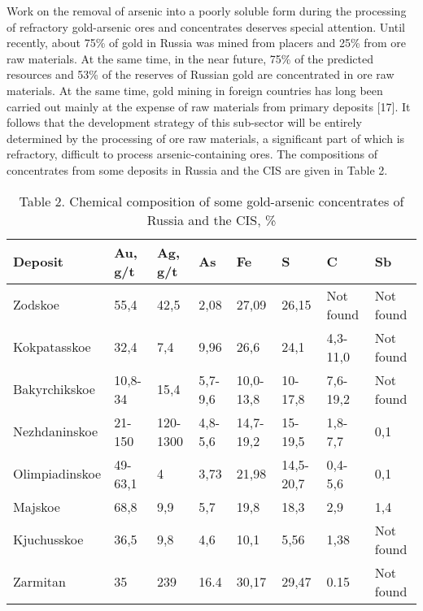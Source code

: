 \begin{multicols}{2}
Work on the removal of arsenic into a poorly soluble form during the
processing of refractory gold-arsenic ores and concentrates deserves
special attention. Until recently, about 75\% of gold in Russia was
mined from placers and 25\% from ore raw materials. At the same time, in
the near future, 75\% of the predicted resources and 53\% of the
reserves of Russian gold are concentrated in ore raw materials. At the
same time, gold mining in foreign countries has long been carried out
mainly at the expense of raw materials from primary deposits {[}17{]}.
It follows that the development strategy of this sub-sector will be
entirely determined by the processing of ore raw materials, a
significant part of which is refractory, difficult to process
arsenic-containing ores. The compositions of concentrates from some
deposits in Russia and the CIS are given in Table 2.
\end{multicols}

\begin{table}[H]
\caption*{Table 2. Chemical composition of some gold-arsenic concentrates
of Russia and the CIS, \%}
\centering
\begin{tabular}{|l|l|l|l|l|l|l|l|}
\hline
Deposit        & Au, g/t & Ag, g/t  & As      & Fe        & S         & C         & Sb        \\ \hline
Zodskoe        & 55,4    & 42,5     & 2,08    & 27,09     & 26,15     & Not found & Not found \\ \hline
Kokpatasskoe   & 32,4    & 7,4      & 9,96    & 26,6      & 24,1      & 4,3-11,0  & Not found \\ \hline
Bakyrchikskoe  & 10,8-34 & 15,4     & 5,7-9,6 & 10,0-13,8 & 10-17,8   & 7,6-19,2  & Not found \\ \hline
Nezhdaninskoe  & 21-150  & 120-1300 & 4,8-5,6 & 14,7-19,2 & 15-19,5   & 1,8-7,7   & 0,1       \\ \hline
Olimpiadinskoe & 49-63,1 & 4        & 3,73    & 21,98     & 14,5-20,7 & 0,4-5,6   & 0,1       \\ \hline
Majskoe        & 68,8    & 9,9      & 5,7     & 19,8      & 18,3      & 2,9       & 1,4       \\ \hline
Kjuchusskoe    & 36,5    & 9,8      & 4,6     & 10,1      & 5,56      & 1,38      & Not found \\ \hline
Zarmitan       & 35      & 239      & 16.4    & 30,17     & 29,47     & 0.15      & Not found \\ \hline
\end{tabular}
\end{table}

